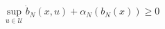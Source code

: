 \documentclass[preview]{standalone}
\begin{document}
\begin{align*}
&\ \sup_{u \in \mathcal{U}} \dot b_N(x, u) + \alpha_N(b_N(x)) \geq 0\\
\end{align*}
\end{document}
